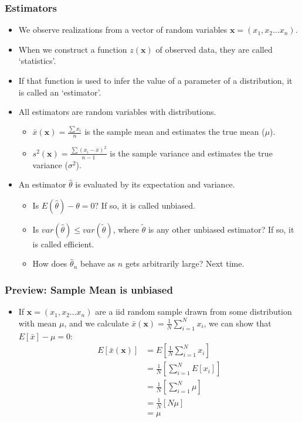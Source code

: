 \documentclass[aspectratio=169, handout]{beamer}
\numberwithin{equation}{section}
\begin{document}
\begin{frame}
\frametitle{Estimators}
\begin{itemize}
\item We observe realizations from a vector of random variables $\boldsymbol{x}=(x_1, x_2 \ldots x_n)$. \pause
\item When we construct a function $z(\boldsymbol{x})$ of observed data, they are called `statistics'. \pause  
\item If that function is used to infer the value of a parameter of a distribution, it is called an `estimator'.\pause
\item All estimators are random variables with distributions.\pause
\begin{itemize}
\item $\bar{x}(\boldsymbol{x})=\frac{\sum x_i }{n}$ is the sample mean and estimates the true mean ($\mu$). \pause
\item $s^2(\boldsymbol{x})=\frac{\sum (x_i-\bar{x})^2 }{n-1}$ is the sample variance and estimates  the true variance ($\sigma^2$).\\ \pause
\end{itemize}
\item An estimator $\hat{\theta}$ is evaluated by its expectation and variance.
\begin{itemize}
\item Is $E(\hat{\theta})-\theta=0$?  If so, it is called unbiased.
\item Is $var(\hat{\theta})\leq var(\tilde{\theta})$, where $\tilde{\theta}$ is any other unbiased estimator?  If so, it is called efficient.
\item How does $\hat{\theta}_n$ behave as $n$ gets arbitrarily large? Next time. 
\end{itemize}
\end{itemize}
\end{frame}

\begin{frame}
\frametitle{Preview: Sample Mean is unbiased}
\begin{itemize}
\item If $\boldsymbol{x}=(x_1, x_2 \ldots x_n)$ are a iid random sample drawn from some distribution with mean $\mu$, and we calculate $\bar{x}(\boldsymbol{x})=\frac{1}{N}\sum_{i=1}^N x_i$, we can show that $E[\bar{x}]-\mu=0$:
\begin{align*}
E[\bar{x}(\boldsymbol{x})]&=E[\frac{1}{N}\sum_{i=1}^N x_i]\\
&=\frac{1}{N}[\sum_{i=1}^N E[x_i]]\\
&=\frac{1}{N}[\sum_{i=1}^N \mu]\\
&=\frac{1}{N}[N \mu]\\
&=\mu
\end{align*}
\end{itemize}
\end{frame}
\end{document}
